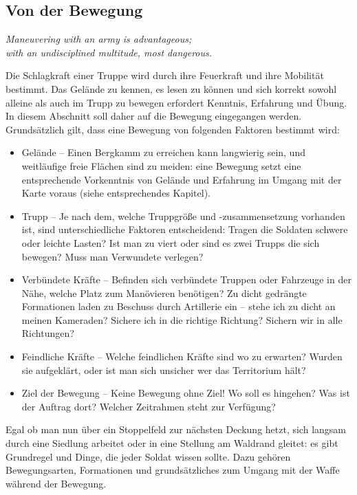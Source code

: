 \newpage
\subsection{Von der Bewegung}
	\begin{center}
		\textit{Maneuvering with an army is advantageous;\\ with an undisciplined multitude, most dangerous.}
	\end{center}

	Die Schlagkraft einer Truppe wird durch ihre Feuerkraft und ihre Mobilität bestimmt. Das Gelände zu kennen, es lesen zu können und sich korrekt sowohl alleine als auch im Trupp zu bewegen erfordert Kenntnis, Erfahrung und Übung. In diesem Abschnitt soll daher auf die Bewegung eingegangen werden.\\

	Grundsätzlich gilt, dass eine Bewegung von folgenden Faktoren bestimmt wird:
	\begin{itemize}
		\item Gelände -- Einen Bergkamm zu erreichen kann langwierig sein, und weitläufige freie Flächen sind zu meiden: eine Bewegung setzt eine 	entsprechende Vorkenntnis von Gelände und Erfahrung im Umgang mit der Karte voraus (siehe entsprechendes Kapitel).
		\item Trupp -- Je nach dem, welche Truppgröße und -zusammensetzung vorhanden ist, sind unterschiedliche Faktoren entscheidend: Tragen die Soldaten schwere oder leichte Lasten? Ist man zu viert oder sind es zwei Trupps die sich bewegen? Muss man Verwundete verlegen? 
		\item Verbündete Kräfte -- Befinden sich verbündete Truppen oder Fahrzeuge in der Nähe, welche Platz zum Manövieren benötigen? Zu dicht gedrängte Formationen laden zu Beschuss durch Artillerie ein -- stehe ich zu dicht an meinen Kameraden? Sichere ich in die richtige Richtung? Sichern wir in alle Richtungen?
		\item Feindliche Kräfte -- Welche feindlichen Kräfte sind wo zu erwarten? Wurden sie aufgeklärt, oder ist man sich unsicher wer das Territorium hält?
		\item Ziel der Bewegung -- Keine Bewegung ohne Ziel! Wo soll es hingehen? Was ist der Auftrag dort? Welcher Zeitrahmen steht zur Verfügung?
	\end{itemize}
	Egal ob man nun über ein Stoppelfeld zur nächsten Deckung hetzt, sich langsam durch eine Siedlung arbeitet oder in eine Stellung am Waldrand gleitet: es gibt Grundregel und Dinge, die jeder Soldat wissen sollte. Dazu gehören Bewegungsarten, Formationen und grundsätzliches zum Umgang mit der Waffe während der Bewegung.

